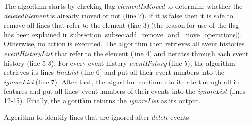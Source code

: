 \documentclass{llncs}
\begin{document}
The algorithm starts by checking flag \emph{elementIsMoved} to determine whether the \emph{deletedElement} is already moved or not (line 2).
If it is false then it is safe to remove all lines that refer to the element (line 3) (the reason for use of the flag has been explained in subsection \ref{subsec:add_remove_and_move_operations}).
Otherwise, no action is executed.
The algorithm then retrieves all event histories \emph{eventHistoryList} that refer to the element (line 4) and iterates through each event history (line 5-8).
For every event history \emph{eventHistory} (line 5), the algorithm retrieves its lines \emph{lineList} (line 6) and put all their event numbers into the \emph{ignoreList} (line 7).
After that, the algorithm continues to iterate through all its features and put all lines' event numbers of their events into the \emph{ignoreList} (lines 12-15). Finally, the algorithm returns the \emph{ignoreList} as its output.

\begin{algorithm}[H]
\begin{small}
\end{small}
\caption{Algorithm to identify lines that are ignored after \emph{delete} events}
\label{alg:create_delete_optimisation}
\end{algorithm}

\end{document}
